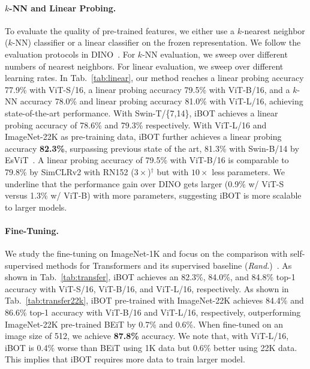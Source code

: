 \documentclass{article} %
\def\ourmethod{{iBOT}\xspace}
\begin{document}
\paragraph{$k$-NN and Linear Probing.} 
To evaluate the quality of pre-trained features, we either use a $k$-nearest neighbor ($k$-NN) classifier or a linear classifier on the frozen representation. 
We follow the evaluation protocols in DINO~\citep{dino}. For $k$-NN evaluation, we sweep over different numbers of nearest neighbors. 
For linear evaluation, we sweep over different learning rates. 
In Tab.~\ref{tab:linear}, our method reaches a linear probing accuracy 77.9\% with ViT-S/16, 
a linear probing accuracy 79.5\% with ViT-B/16, and a $k$-NN accuracy 78.0\% and linear probing accuracy 81.0\% with ViT-L/16, achieving state-of-the-art performance.
With Swin-T/\{7,14\}, \ourmethod achieves a linear probing accuracy of 78.6\% and 79.3\% respectively.%
With ViT-L/16 and ImageNet-22K as pre-training data, \ourmethod further achieves a linear probing accuracy \textbf{82.3\%}, surpassing previous state of the art, 81.3\% with Swin-B/14 by EsViT~\citep{esvit}.
A linear probing accuracy of 79.5\% with ViT-B/16 is comparable to 79.8\% by SimCLRv2 with RN152 ($3\times$)$^\dag$ but with $10\times$ less parameters.
We underline that the performance gain over DINO gets larger (0.9\% w/ ViT-S versus 1.3\% w/ ViT-B) with more parameters, suggesting \ourmethod is more scalable to larger models.

\paragraph{Fine-Tuning.} 
We study the fine-tuning on ImageNet-1K %
and focus on the comparison with self-supervised methods for Transformers and its supervised baseline (\textit{Rand.})~\citep{deit}. 
As shown in Tab.~\ref{tab:transfer}, \ourmethod achieves an 82.3\%, 84.0\%, and 84.8\% top-1 accuracy with ViT-S/16, ViT-B/16, and ViT-L/16, respectively.
As shown in Tab.~\ref{tab:transfer22k}, \ourmethod pre-trained with ImageNet-22K achieves 84.4\% and 86.6\% top-1 accuracy with ViT-B/16 and ViT-L/16, respectively, outperforming ImageNet-22K pre-trained BEiT by 0.7\% and 0.6\%. 
When fine-tuned on an image size of 512, we achieve \textbf{87.8\%} accuracy.
We note that, with ViT-L/16, \ourmethod is 0.4\% worse than BEiT using 1K data but 0.6\% better using 22K data. This implies that \ourmethod requires more data to train larger model.
\end{document}
